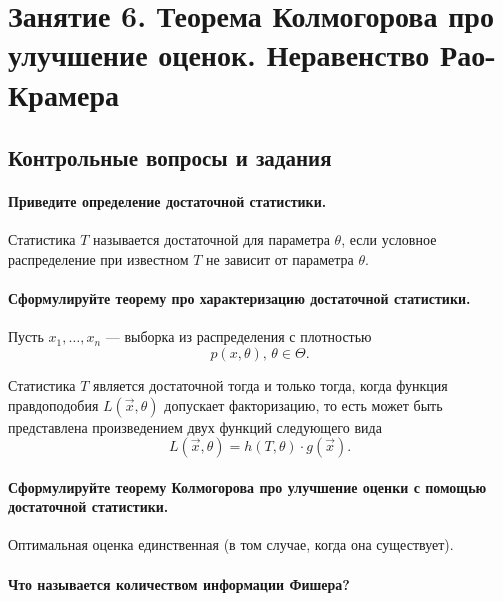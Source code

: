\chapter*{Занятие 6. Теорема Колмогорова про улучшение оценок. Неравенство Рао-Крамера}

\section*{Контрольные вопросы и задания}

\subsubsection*{Приведите определение достаточной статистики.}

Статистика $T$ называется достаточной для параметра $ \theta $,
если условное распределение при известном $T$ не зависит от параметра $ \theta $.

\subsubsection*{Сформулируйте теорему про характеризацию достаточной статистики.}

Пусть $x_1, \dotsc, x_n$ ---
выборка из распределения с плотностью
$$p \left( x, \theta \right), \,
  \theta \in \Theta.$$

Статистика $T$ является достаточной тогда и только тогда,
когда функция правдоподобия $L \left( \vec{x}, \theta \right) $ допускает факторизацию,
то есть может быть представлена произведением двух функций следующего вида
$$L \left( \vec{x}, \theta \right) =
  h \left( T, \theta \right) \cdot g \left( \vec{x} \right).$$

\subsubsection*{Сформулируйте теорему Колмогорова про улучшение
                оценки с помощью достаточной статистики.}

Оптимальная оценка единственная (в том случае, когда она существует).

\subsubsection*{Что называется количеством информации Фишера?}


